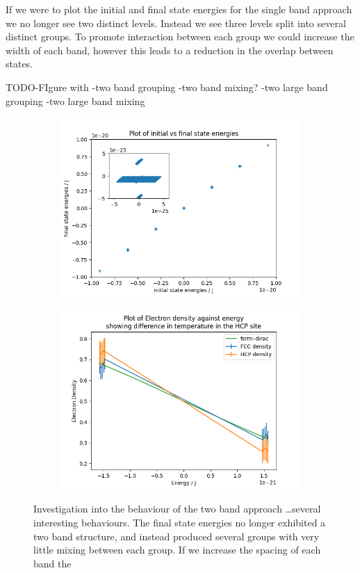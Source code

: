 If we were to plot the initial and final
state energies for the single band approach
we no longer see two distinct levels. Instead
we see three levels split into
several distinct groups.
To promote interaction between each group
we could increase the width of each band,
however this leads to a reduction in
the overlap between states.

TODO-FIgure with
-two band grouping
-two band mixing?
-two large band grouping
-two large band mixing

\begin{figure}[htbp]
    \centering
    \begin{subfigure}{0.45\linewidth}
        \includegraphics[width=0.9\linewidth]{Figures/Simulation/two band eigenstate energies varience.png}
        \label{fig:two band minimum mixing}
    \end{subfigure}
    \hfill
    \begin{subfigure}{0.45\linewidth}
        \includegraphics[width=0.9\linewidth]{Figures/Simulation/two band electron distribution.png}
    \end{subfigure}
    \caption{Investigation into the behaviour of the
        two band approach \ldots several interesting
        behaviours.
        The final state energies no longer exhibited
        a two band structure, and instead
        produced several groups with very little
        mixing between each group. If we increase
        the spacing of each band the }\label{fig:issue with two band approach}
\end{figure}
